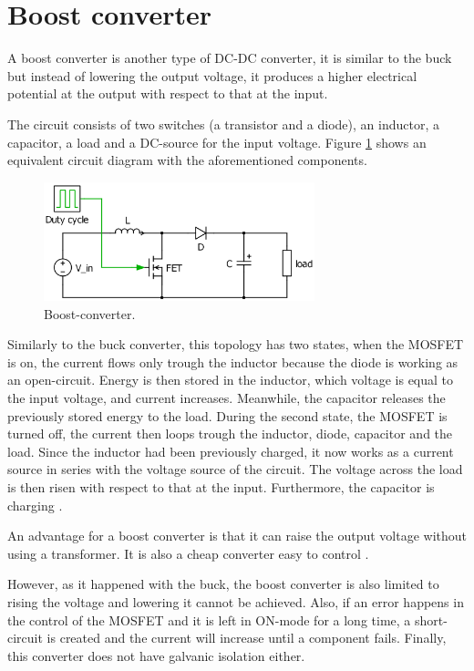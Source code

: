 \section{Boost converter\label{Boost-C}}

A boost converter is another type of DC-DC converter, it is similar to the buck but instead of lowering the output voltage, it produces a higher electrical potential at the output with respect to that at the input.

The circuit consists of two switches (a transistor and a diode), an inductor, a capacitor, a load and a DC-source for the input voltage. Figure \ref{Boost-converter} shows an equivalent circuit diagram with the aforementioned components. %

\begin{figure}[htbp]
	\begin{center}
		\includegraphics[width=0.7\textwidth]{../Pictures/Boost-converter}
		\caption{Boost-converter.}
		\label{Boost-converter}
	\end{center}	
\end{figure}

Similarly to the buck converter, this topology has two states, when the MOSFET is on, the current flows only trough the inductor because the diode  is working as an open-circuit. Energy is then stored in the inductor, which voltage is equal to the input voltage, and current increases. Meanwhile, the capacitor releases the previously stored energy to the load.
During the second state, the MOSFET is turned off, the current then loops trough the inductor, diode, capacitor and the load. Since the inductor had been previously charged, it now works as a current source in series with the voltage source of the circuit. The voltage across the load is then risen with respect to that at the input. Furthermore, the capacitor is charging \cite{schematicbuckandboost}.

An advantage for a boost converter is that it can raise the output voltage without using a transformer. It is also a cheap converter easy to control \cite{advantageboost}. 

However, as it happened with the buck, the boost converter is also limited to rising the voltage and lowering it cannot be achieved. Also, if an error happens in the control of the MOSFET and it is left in ON-mode for a long time, a short-circuit is created and the current will increase until a component fails. Finally, this converter does not have galvanic isolation either. 
 
